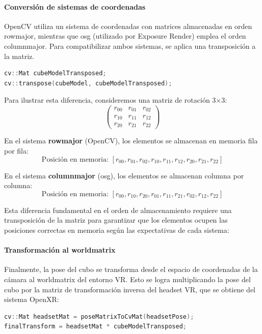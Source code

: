 \paragraph{Conversión de sistemas de coordenadas}
OpenCV utiliza un sistema de coordenadas con matrices almacenadas en orden \gls{rowmajor}, mientras que \acrshort{osg} (utilizado por Exposure Render) emplea el orden \gls{columnmajor}. Para compatibilizar ambos sistemas, se aplica una transposición a la matriz.
\begin{lstlisting}[language=C++]
cv::Mat cubeModelTransposed;
cv::transpose(cubeModel, cubeModelTransposed);
\end{lstlisting}
Para ilustrar esta diferencia, consideremos una matriz de rotación 3×3:
$$
\begin{pmatrix}
r_{00} & r_{01} & r_{02} \\
r_{10} & r_{11} & r_{12} \\
r_{20} & r_{21} & r_{22}
\end{pmatrix}
$$

En el sistema \textbf{\gls{rowmajor}} (OpenCV), los elementos se almacenan en memoria fila por fila:
$$\text{Posición en memoria: } [r_{00}, r_{01}, r_{02}, r_{10}, r_{11}, r_{12}, r_{20}, r_{21}, r_{22}]$$

En el sistema \textbf{\gls{columnmajor}} (\acrshort{osg}), los elementos se almacenan columna por columna:
$$\text{Posición en memoria: } [r_{00}, r_{10}, r_{20}, r_{01}, r_{11}, r_{21}, r_{02}, r_{12}, r_{22}]$$

Esta diferencia fundamental en el orden de almacenamiento requiere una transposición de la matriz para garantizar que los elementos ocupen las posiciones correctas en memoria según las expectativas de cada sistema:




\paragraph{Transformación al \gls{worldmatrix}}
Finalmente, la pose del cubo se transforma desde el espacio de coordenadas de la cámara al \gls{worldmatrix} del entorno VR. Esto se logra multiplicando la pose del cubo por la matriz de transformación inversa del headset VR, que se obtiene del sistema OpenXR:

\begin{lstlisting}[language=C++]
cv::Mat headsetMat = poseMatrixToCvMat(headsetPose);
finalTransform = headsetMat * cubeModelTransposed;
\end{lstlisting}

